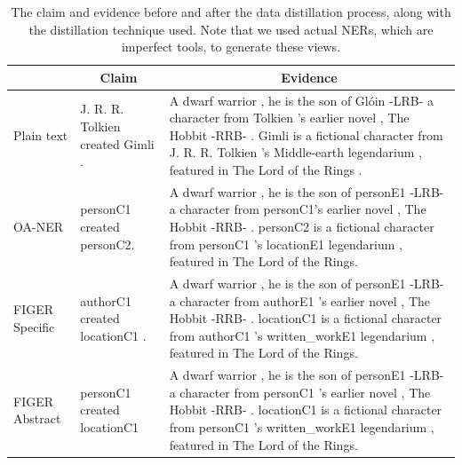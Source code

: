 \begin{table}[t]
\footnotesize
\begin{tabular}{p{12mm}p{25mm}p{90mm} }
\toprule
 & \multicolumn{1}{c}{Claim} & \multicolumn{1}{c}{Evidence} \\
\midrule
\vspace{2mm}Plain text & \vspace{.1mm}J. R. R. Tolkien created Gimli .  & A dwarf warrior , he is the son of Glóin -LRB- a character from Tolkien 's earlier novel , The Hobbit -RRB- . Gimli is a fictional character from J. R. R. Tolkien 's Middle-earth legendarium , featured in The Lord of the Rings . \\
\midrule

\vspace{2mm}OA-NER & \vspace{.1mm}personC1 created personC2.   & A dwarf warrior , he is the son of personE1 -LRB- a character from personC1's earlier novel , The Hobbit -RRB- . personC2 is a fictional character from personC1 's locationE1 legendarium , featured in The Lord of the Rings. \\
\midrule
\vspace{2mm}FIGER Specific & \vspace{.1mm}authorC1 created locationC1 .   & A dwarf warrior , he is the son of personE1 -LRB- a character from authorE1 's earlier novel , The Hobbit -RRB- .   locationC1 is a fictional character from authorC1 's written\_workE1 legendarium , featured in The Lord of the Rings.  \\
\midrule
\vspace{2mm}FIGER Abstract & \vspace{.1mm} personC1 created locationC1   & A dwarf warrior , he is the son of personE1 -LRB- a character from personC1 's earlier novel , The Hobbit -RRB- .   locationC1 is a fictional character from personC1 's written\_workE1 legendarium , featured in The Lord of the Rings.  \\

\bottomrule
\end{tabular}
 \caption{  The claim and evidence before and after the data distillation process, along with the distillation technique used. Note that we used actual NERs, which are imperfect tools, to generate these views.}
\label{distillation_examples}
\vspace*{-5mm}
\end{table}


